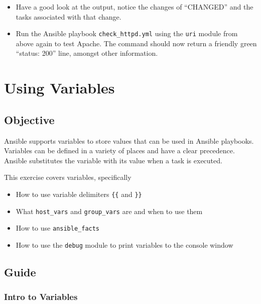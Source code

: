 \begin{itemize}
\item
  Have a good look at the output, notice the changes of ``CHANGED'' and
  the tasks associated with that change.
\item
  Run the Ansible playbook \texttt{check\_httpd.yml} using the \texttt{uri} module
  from above again to test Apache. The command should now return a
  friendly green ``status: 200'' line, amongst other information.
\end{itemize}

\hypertarget{using-variables}{%
\section{Using Variables}\label{using-variables}}

\hypertarget{objective}{%
\subsection{Objective}\label{objective}}

Ansible supports variables to store values that can be used in Ansible
playbooks. Variables can be defined in a variety of places and have a
clear precedence. Ansible substitutes the variable with its value when a
task is executed.

This exercise covers variables, specifically

\begin{itemize}
\tightlist
\item
  How to use variable delimiters \texttt{\{\{} and \texttt{\}\}}
\item
  What \texttt{host\_vars} and \texttt{group\_vars} are and when to use
  them
\item
  How to use \texttt{ansible\_facts}
\item
  How to use the \texttt{debug} module to print variables to the console
  window
\end{itemize}

\hypertarget{guide}{%
\subsection{Guide}\label{guide}}

\hypertarget{intro-to-variables}{%
\subsubsection{Intro to Variables}\label{intro-to-variables}}

